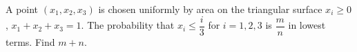 A point $(x_1,x_2,x_3)$ is chosen uniformly by area on the triangular surface $x_i\ge0$, $x_1+x_2+x_3=1$. The probability that $x_i\le \dfrac{i}{3}$ for $i=1,2,3$ is $\dfrac{m}{n}$ in lowest terms. Find $m+n$.
